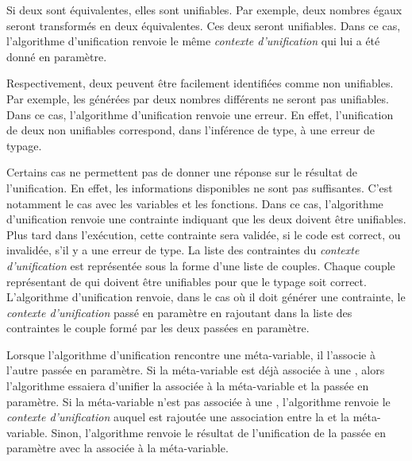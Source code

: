                 Si deux \lexp{} sont équivalentes, elles sont unifiables. Par exemple, deux nombres égaux seront transformés en deux \lexp{} équivalentes.
                Ces deux \lexp{} seront unifiables.
                Dans ce cas, l'algorithme d'unification renvoie le même \textit{contexte d'unification} qui lui a été donné en paramètre.

                Respectivement, deux \lexp{} peuvent être facilement identifiées comme non unifiables. Par exemple, les \lexp{} générées par deux nombres différents
                ne seront pas unifiables.
                Dans ce cas, l'algorithme d'unification renvoie une erreur. En effet, l'unification de deux \lexp{} non unifiables correspond,
                dans l'inférence de type, à une erreur de typage.

                Certains cas ne permettent pas de donner une réponse sur le résultat de l'unification. En effet, les informations disponibles
                ne sont pas suffisantes. C'est notamment le cas avec les variables et les fonctions.
                Dans ce cas, l'algorithme d'unification renvoie une contrainte indiquant que les deux \lexp{} doivent être unifiables.
                Plus tard dans l'exécution, cette contrainte sera validée, si le code est correct, ou invalidée, s'il y a une erreur de type.
                La liste des contraintes du \textit{contexte d'unification} est représentée sous la forme d'une liste de couples.
                Chaque couple représentant de \lexp{} qui doivent être unifiables pour que le typage soit correct.
                L'algorithme d'unification renvoie, dans le cas où il doit générer une contrainte, le \textit{contexte d'unification} passé en paramètre
                en rajoutant dans la liste des contraintes le couple formé par les deux \lexp{} passées en paramètre.

                Lorsque l'algorithme d'unification rencontre une méta-variable, il l'associe à l'autre \lexp{} passée en paramètre.
                Si la méta-variable est déjà associée à une \lexp{}, alors l'algorithme essaiera d'unifier la \lexp{} associée à la méta-variable
                et la \lexp{} passée en paramètre.
                Si la méta-variable n'est pas associée à une \lexp{}, l'algorithme renvoie le \textit{contexte d'unification} auquel est rajoutée une
                association entre la \lexp{} et la méta-variable. Sinon, l'algorithme renvoie le résultat de l'unification de la \lexp{} passée en paramètre
                avec la \lexp{} associée à la méta-variable.

